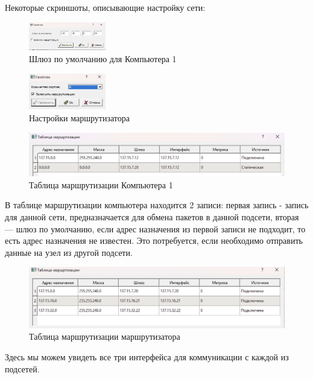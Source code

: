 \documentclass[12pt,onecolumn]{article}
\begin{document}
Некоторые скриншоты, описывающие настройку сети:
\begin{figure}[H]
    \centering
    \includegraphics[width=0.3\textwidth]{image/part-1/default-gate.png}
    \caption{Шлюз по умолчанию для Компьютера 1}
\end{figure}
\begin{figure}[H]
    \centering
    \includegraphics[width=0.3\textwidth]{image/part-1/router-settings.png}
    \caption{Настройки маршрутизатора}
\end{figure}
\begin{figure}[H]
    \centering
    \includegraphics[width=\textwidth]{image/part-1/routung-table-1.png}
    \caption{Таблица маршрутизации Компьютера 1}
\end{figure}

В таблице маршрутизации компьютера находится 2 записи: первая запись -
запись для данной сети, предназначается для обмена пакетов в данной подсети,
вторая — шлюз по умолчанию, если адрес назначения из первой записи не
подходит, то есть адрес назначения не известен. Это потребуется, если
необходимо отправить данные на узел из другой подсети.

\begin{figure}[H]
    \centering
    \includegraphics[width=\textwidth]{image/part-1/router-routing.png}
    \caption{Таблица маршрутизации маршрутизатора}  
\end{figure}


Здесь мы можем увидеть все три интерфейса для коммуникации с каждой из подсетей.
\end{document}
